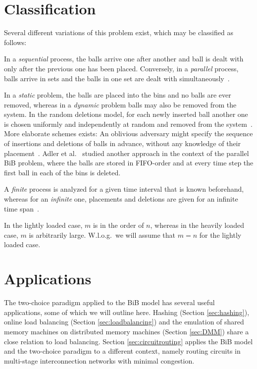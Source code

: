 \documentclass[a4paper,12pt]{article}
\begin{document}
\section{Classification}
\label{sec:classification}
Several different variations of this problem exist, which may be classified as follows:
\begin{compactitem}
\item In a \emph{sequential} process, the balls arrive one after another and ball is dealt with only after the previous one has been placed. Conversely, in a \emph{parallel} process, balls arrive in sets and the balls in one set are dealt with simultaneously~\cite{ABS98}. 
\item In a \emph{static} problem, the balls are placed into the bins and no balls are ever removed, whereas in a \emph{dynamic} problem balls may also be removed from the system. In the random deletions model, for each newly inserted ball another one is chosen uniformly and independently at random and removed from the system~\cite{ABKU99, MRS01}. More elaborate schemes exists: An oblivious adversary might specify the sequence of insertions and deletions of balls in advance, without any knowledge of their placement~\cite{CFM+98}. Adler et al.~\cite{ABS98} studied another approach in the context of the parallel BiB problem, where the balls are stored in FIFO-order and at every time step the first ball in each of the bins is deleted. 
\item A \emph{finite} process is analyzed for a given time interval that is known beforehand, whereas for an \emph{infinite} one, placements and deletions are given for an infinite time span~\cite{ABS98}.
\item In the lightly loaded case, $m$ is in the order of $n$, whereas in the heavily loaded case, $m$ is arbitrarily large. W.l.o.g.~we will assume that $m = n$ for the lightly loaded case. 
\end{compactitem}

\section{Applications}
\label{sec:applications}
The two-choice paradigm applied to the BiB model has several useful applications, some of which we will outline here. Hashing (Section \ref{sec:hashing}), online load balancing (Section \ref{sec:loadbalancing}) and the emulation of shared memory machines on distributed memory machines (Section \ref{sec:DMM}) share a close relation to load balancing. Section \ref{sec:circuitrouting} applies the BiB model and the two-choice paradigm to a different context, namely routing circuits in multi-stage interconnection networks with minimal congestion.
\end{document}
